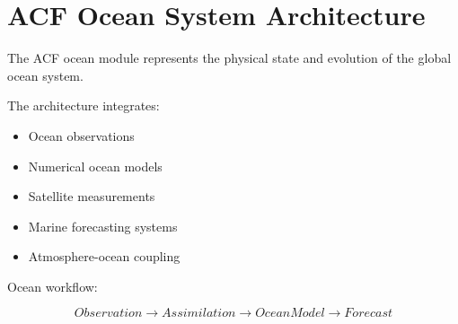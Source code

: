 \section{ACF Ocean System Architecture}


The ACF ocean module represents the physical state and evolution
of the global ocean system.



The architecture integrates:


\begin{itemize}

\item Ocean observations

\item Numerical ocean models

\item Satellite measurements

\item Marine forecasting systems

\item Atmosphere-ocean coupling

\end{itemize}



Ocean workflow:


\begin{equation}
Observation
\rightarrow
Assimilation
\rightarrow
Ocean Model
\rightarrow
Forecast
\end{equation}

